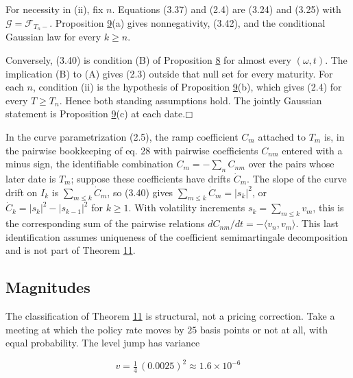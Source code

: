 \documentclass[11pt]{article}
\providecommand{\square}{\mdlgwhtsquare}
\begin{document}
For necessity in (ii), fix \(n\). Equations (3.37) and (2.4) are (3.24) and (3.25) with \(\mathcal G = \mathcal F_{T_n-}\). Proposition \hyperref[res:Proposition-9]{9}(a) gives nonnegativity, (3.42), and the conditional Gaussian law for every \(k \ge n\).

Conversely, (3.40) is condition (B) of Proposition \hyperref[res:Proposition-8]{8} for almost every \((\omega,t)\). The implication (B) to (A) gives (2.3) outside that null set for every maturity. For each \(n\), condition (ii) is the hypothesis of Proposition \hyperref[res:Proposition-9]{9}(b), which gives (2.4) for every \(T \ge T_n\). Hence both standing assumptions hold. The jointly Gaussian statement is Proposition \hyperref[res:Proposition-9]{9}(c) at each date.\hfill$\square$

In the curve parametrization (2.5), the ramp coefficient \(C_m\) attached to \(T_m\) is, in the pairwise bookkeeping of \cite{gellert2021short} eq. 28 with pairwise coefficients \(C_{nm}\) entered with a minus sign, the identifiable combination \(C_m = -\sum_n C_{nm}\) over the pairs whose later date is \(T_m\); suppose these coefficients have drifts \(\dot C_m\). The slope of the curve drift on \(I_k\) is \(\sum_{m \le k}\dot C_m\), so (3.40) gives \(\sum_{m \le k}\dot C_m = |s_k|^2\), or \(\dot C_k = |s_k|^2-|s_{k-1}|^2\) for \(k \ge 1\). With volatility increments \(s_k=\sum_{m \le k}v_m\), this is the corresponding sum of the pairwise relations \(dC_{nm}/dt=-\langle v_n,v_m\rangle\). This last identification assumes uniqueness of the coefficient semimartingale decomposition and is not part of Theorem \hyperref[res:Theorem-11]{11}.

\subsection{Magnitudes}\label{sec:3.9}

The classification of Theorem \hyperref[res:Theorem-11]{11} is structural, not a pricing correction. Take a meeting at which the policy rate moves by \(25\) basis points or not at all, with equal probability. The level jump has variance

\begin{equation*}
v = \tfrac14\,(0.0025)^2 \approx 1.6 \times 10^{-6} \tag{3.44}\label{eq:3.44}
\end{equation*}
\end{document}
